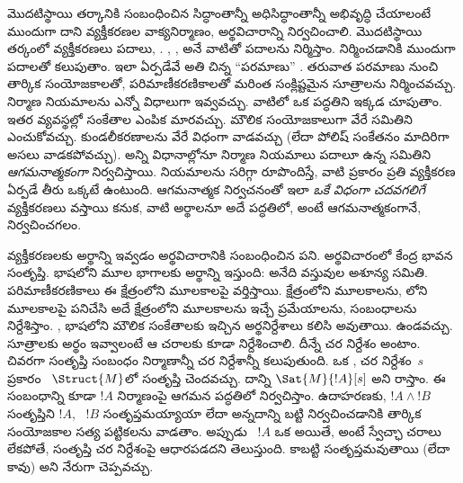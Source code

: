 \documentclass[../../../include/open-logic-section]{subfiles}
\begin{document}


మొదటిస్థాయి తర్కానికి సంబంధించిన సిద్ధాంతాన్నీ అధిసిద్ధాంతాన్నీ అభివృద్ధి చేయాలంటే ముందుగా దాని వ్యక్తీకరణల వాక్యనిర్మాణం, అర్థవిచారాన్ని నిర్వచించాలి. మొదటిస్థాయి తర్కంలో వ్యక్తీకరణలు పదాలు, . , ,  అనే వాటితో పదాలను నిర్మిస్తాం.  నిర్మించడానికి ముందుగా  పదాలతో కలుపుతాం. ఇలా ఏర్పడేవే అతి చిన్న ``పరమాణు'' . తరువాత పరమాణు  నుంచి తార్కిక సంయోజకాలతో, పరిమాణీకరణికాలతో మరింత సంక్లిష్టమైన సూత్రాలను నిర్మించవచ్చు. నిర్మాణ నియమాలను ఎన్నో విధాలుగా ఇవ్వవచ్చు. వాటిలో ఒక పద్ధతిని ఇక్కడ చూపుతాం. ఇతర వ్యవస్థల్లో సంకేతాల ఎంపిక మారవచ్చు. మౌలిక సంయోజకాలుగా వేరే సమితిని ఎంచుకోవచ్చు. కుండలీకరణాలను వేరే విధంగా వాడవచ్చు (లేదా పోలిష్ సంకేతనం మాదిరిగా అసలు వాడకపోవచ్చు). అన్ని విధానాల్లోనూ నిర్మాణ నియమాలు పదాలూ  ఉన్న సమితిని \emph{ఆగమనాత్మకంగా} నిర్వచిస్తాయి. నియమాలను సరిగ్గా రూపొందిస్తే, వాటి ప్రకారం ప్రతి వ్యక్తీకరణ ఏర్పడే తీరు ఒక్కటే ఉంటుంది. ఆగమనాత్మక నిర్వచనంతో ఇలా \emph{ఒకే విధంగా చదవగలిగే} వ్యక్తీకరణలు వస్తాయి కనుక, వాటి అర్థాలనూ అదే పద్ధతిలో, అంటే ఆగమనాత్మకంగానే, నిర్వచించగలం.

వ్యక్తీకరణలకు అర్థాన్ని ఇవ్వడం అర్థవిచారానికి సంబంధించిన పని. అర్థవిచారంలో కేంద్ర భావన  సంతృప్తి.  భాషలోని మూల భాగాలకు అర్థాన్ని ఇస్తుంది:  అనేది వస్తువుల అశూన్య సమితి. పరిమాణీకరణికాలు ఈ క్షేత్రంలోని మూలకాలపై వర్తిస్తాయి.  క్షేత్రంలోని మూలకాలను,  లోని మూలకాలపై పనిచేసి అదే క్షేత్రంలోని మూలకాలను ఇచ్చే ప్రమేయాలను,   సంబంధాలను నిర్దేశిస్తాం. , భాషలోని మౌలిక సంకేతాలకు ఇచ్చిన అర్థనిర్దేశాలు కలిసి  అవుతాయి.   ఉండవచ్చు. సూత్రాలకు అర్థం ఇవ్వాలంటే ఆ చరాలకు కూడా   నిర్దేశించాలి. దీన్నే చర నిర్దేశం అంటాం. చివరగా సంతృప్తి సంబంధం నిర్మాణాన్నీ చర నిర్దేశాన్నీ కలుపుతుంది. ఒక , చర నిర్దేశం~$s$ ప్రకారం ~$\Struct{M}$లో సంతృప్తి చెందవచ్చు. దాన్ని $\Sat{M}{!A}[s]$ అని రాస్తాం. ఈ సంబంధాన్ని కూడా $!A$ నిర్మాణంపై ఆగమన పద్ధతిలో నిర్వచిస్తాం. ఉదాహరణకు, $!A \land !B$ సంతృప్తిని $!A$, ~$!B$ సంతృప్తమయ్యాయా లేదా అన్నదాన్ని బట్టి నిర్వచించడానికి తార్కిక సంయోజకాల సత్య పట్టికలను వాడతాం. అప్పుడు ~$!A$ ఒక  అయితే, అంటే స్వేచ్ఛా చరాలు లేకపోతే, సంతృప్తి చర నిర్దేశంపై ఆధారపడదని తెలుస్తుంది. కాబట్టి   సంతృప్తమవుతాయి (లేదా కావు) అని నేరుగా చెప్పవచ్చు.
\end{document}
